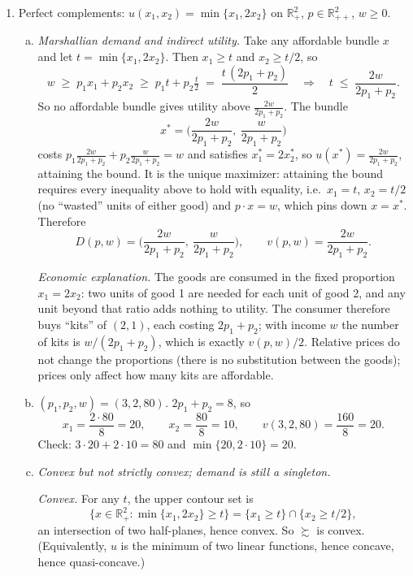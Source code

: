\documentclass[12pt]{article}
\newcommand{\pref}{\succsim}
\newcommand{\R}{\mathbb{R}}
\begin{document}
\begin{enumerate}
\item Perfect complements: $u(x_1,x_2) = \min\{x_1, 2x_2\}$ on $\R^2_+$, $p \in \R^2_{++}$, $w \ge 0$.

\begin{enumerate}[(a)]
\item \emph{Marshallian demand and indirect utility.}
Take any affordable bundle $x$ and let $t = \min\{x_1, 2x_2\}$. Then $x_1 \ge t$ and $x_2 \ge t/2$, so
\[
w \;\ge\; p_1x_1 + p_2x_2 \;\ge\; p_1 t + p_2 \tfrac{t}{2} \;=\; \frac{t\,(2p_1+p_2)}{2}
\quad\Longrightarrow\quad t \;\le\; \frac{2w}{2p_1+p_2}.
\]
So no affordable bundle gives utility above $\tfrac{2w}{2p_1+p_2}$. The bundle
\[
x^* = \Big( \frac{2w}{2p_1+p_2},\ \frac{w}{2p_1+p_2} \Big)
\]
costs $p_1\tfrac{2w}{2p_1+p_2} + p_2\tfrac{w}{2p_1+p_2} = w$ and satisfies $x_1^* = 2x_2^*$, so $u(x^*) = \tfrac{2w}{2p_1+p_2}$, attaining the bound. It is the unique maximizer: attaining the bound requires every inequality above to hold with equality, i.e.\ $x_1 = t$, $x_2 = t/2$ (no ``wasted'' units of either good) and $p\cdot x = w$, which pins down $x = x^*$. Therefore
\[
D(p,w) = \Big( \frac{2w}{2p_1+p_2},\ \frac{w}{2p_1+p_2} \Big), \qquad
v(p,w) = \frac{2w}{2p_1+p_2}.
\]

\emph{Economic explanation.} The goods are consumed in the fixed proportion $x_1 = 2x_2$: two units of good 1 are needed for each unit of good 2, and any unit beyond that ratio adds nothing to utility. The consumer therefore buys ``kits'' of $(2,1)$, each costing $2p_1 + p_2$; with income $w$ the number of kits is $w/(2p_1+p_2)$, which is exactly $v(p,w)/2$. Relative prices do not change the proportions (there is no substitution between the goods); prices only affect how many kits are affordable.

\item \emph{$(p_1,p_2,w) = (3,2,80)$.}
$2p_1+p_2 = 8$, so
\[
x_1 = \frac{2\cdot 80}{8} = 20, \qquad x_2 = \frac{80}{8} = 10, \qquad v(3,2,80) = \frac{160}{8} = 20 .
\]
Check: $3\cdot 20 + 2\cdot 10 = 80$ and $\min\{20, 2\cdot 10\} = 20$.

\item \emph{Convex but not strictly convex; demand is still a singleton.}

\emph{Convex.} For any $t$, the upper contour set is
\[
\{x \in \R^2_+ : \min\{x_1,2x_2\} \ge t\} = \{x_1 \ge t\} \cap \{x_2 \ge t/2\},
\]
an intersection of two half-planes, hence convex. So $\pref$ is convex. (Equivalently, $u$ is the minimum of two linear functions, hence concave, hence quasi-concave.)


\end{enumerate}
\end{enumerate}
\end{document}
